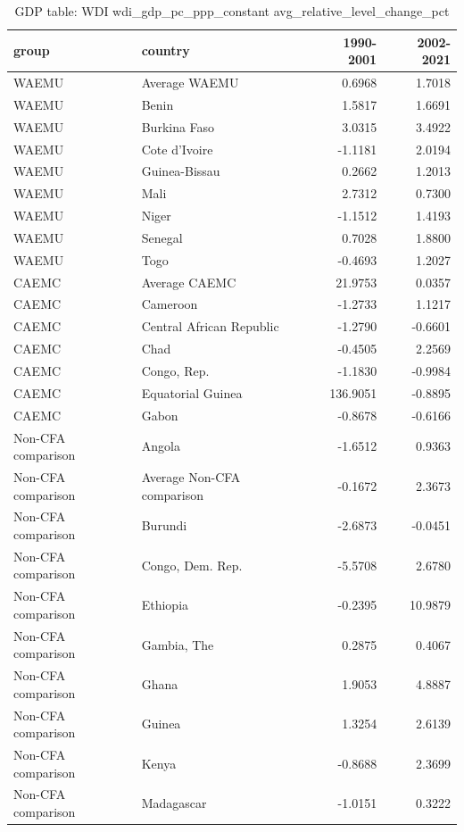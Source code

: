 \begin{table}

\caption{GDP table: WDI wdi_gdp_pc_ppp_constant avg_relative_level_change_pct}
\centering
\begin{tabular}[t]{llrr}
\toprule
group & country & 1990-2001 & 2002-2021\\
\midrule
WAEMU & Average WAEMU & 0.6968 & 1.7018\\
WAEMU & Benin & 1.5817 & 1.6691\\
WAEMU & Burkina Faso & 3.0315 & 3.4922\\
WAEMU & Cote d'Ivoire & -1.1181 & 2.0194\\
WAEMU & Guinea-Bissau & 0.2662 & 1.2013\\
\addlinespace
WAEMU & Mali & 2.7312 & 0.7300\\
WAEMU & Niger & -1.1512 & 1.4193\\
WAEMU & Senegal & 0.7028 & 1.8800\\
WAEMU & Togo & -0.4693 & 1.2027\\
CAEMC & Average CAEMC & 21.9753 & 0.0357\\
\addlinespace
CAEMC & Cameroon & -1.2733 & 1.1217\\
CAEMC & Central African Republic & -1.2790 & -0.6601\\
CAEMC & Chad & -0.4505 & 2.2569\\
CAEMC & Congo, Rep. & -1.1830 & -0.9984\\
CAEMC & Equatorial Guinea & 136.9051 & -0.8895\\
\addlinespace
CAEMC & Gabon & -0.8678 & -0.6166\\
Non-CFA comparison & Angola & -1.6512 & 0.9363\\
Non-CFA comparison & Average Non-CFA comparison & -0.1672 & 2.3673\\
Non-CFA comparison & Burundi & -2.6873 & -0.0451\\
Non-CFA comparison & Congo, Dem. Rep. & -5.5708 & 2.6780\\
\addlinespace
Non-CFA comparison & Ethiopia & -0.2395 & 10.9879\\
Non-CFA comparison & Gambia, The & 0.2875 & 0.4067\\
Non-CFA comparison & Ghana & 1.9053 & 4.8887\\
Non-CFA comparison & Guinea & 1.3254 & 2.6139\\
Non-CFA comparison & Kenya & -0.8688 & 2.3699\\
\addlinespace
Non-CFA comparison & Madagascar & -1.0151 & 0.3222\\

\end{tabular}
\end{table}
